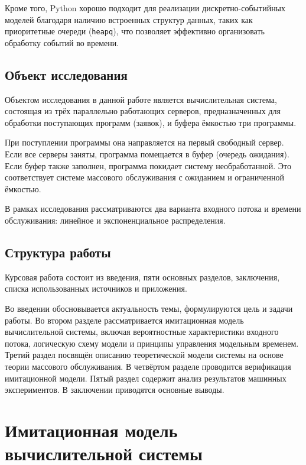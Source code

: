 \documentclass[14pt,a4paper]{extarticle}
\begin{document}
Кроме того, Python хорошо подходит для реализации дискретно-событийных моделей
благодаря наличию встроенных структур данных, таких как приоритетные очереди
(\texttt{heapq}), что позволяет эффективно организовать обработку событий во
времени.

\subsection{Объект исследования}

Объектом исследования в данной работе является вычислительная система,
состоящая из трёх параллельно работающих серверов, предназначенных для обработки
поступающих программ (заявок), и буфера ёмкостью три программы.

При поступлении программы она направляется на первый свободный сервер. Если все
серверы заняты, программа помещается в буфер (очередь ожидания). Если буфер
также заполнен, программа покидает систему необработанной. Это соответствует
системе массового обслуживания с ожиданием и ограниченной ёмкостью.

В рамках исследования рассматриваются два варианта входного потока и времени
обслуживания: линейное и экспоненциальное распределения.

\subsection{Структура работы}

Курсовая работа состоит из введения, пяти основных разделов, заключения, списка
использованных источников и приложения.

Во введении обосновывается актуальность темы, формулируются цель и задачи работы.
Во втором разделе рассматривается имитационная модель вычислительной системы,
включая вероятностные характеристики входного потока, логическую схему модели и
принципы управления модельным временем. Третий раздел посвящён описанию
теоретической модели системы на основе теории массового обслуживания. В четвёртом
разделе проводится верификация имитационной модели. Пятый раздел содержит анализ
результатов машинных экспериментов. В заключении приводятся основные выводы.

\newpage
\section{Имитационная модель вычислительной системы}
\end{document}
